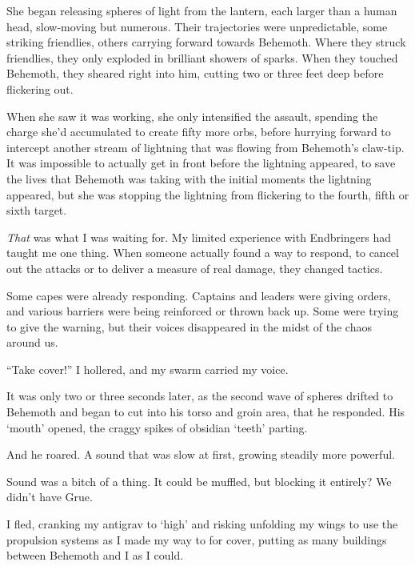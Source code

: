 She began releasing spheres of light from the lantern, each larger than a human head, slow-moving but numerous.  Their trajectories were unpredictable, some striking friendlies, others carrying forward towards Behemoth.  Where they struck friendlies, they only exploded in brilliant showers of sparks.  When they touched Behemoth, they sheared right into him, cutting two or three feet deep before flickering out.



When she saw it was working, she only intensified the assault, spending the charge she'd accumulated to create fifty more orbs, before hurrying forward to intercept another stream of lightning that was flowing from Behemoth's claw-tip.  It was impossible to actually get in front before the lightning appeared, to save the lives that Behemoth was taking with the initial moments the lightning appeared, but she was stopping the lightning from flickering to the fourth, fifth or sixth target.



\emph{That} was what I was waiting for.  My limited experience with Endbringers had taught me one thing.  When someone actually found a way to respond, to cancel out the attacks or to deliver a measure of real damage, they changed tactics.



Some capes were already responding.  Captains and leaders were giving orders, and various barriers were being reinforced or thrown back up.  Some were trying to give the warning, but their voices disappeared in the midst of the chaos around us.



``Take cover!'' I hollered, and my swarm carried my voice.



It was only two or three seconds later, as the second wave of spheres drifted to Behemoth and began to cut into his torso and groin area, that he responded.  His `mouth' opened, the craggy spikes of obsidian `teeth' parting.



And he roared.  A sound that was slow at first, growing steadily more powerful.



Sound was a bitch of a thing.  It could be muffled, but blocking it entirely?  We didn't have Grue.



I fled, cranking my antigrav to `high' and risking unfolding my wings to use the propulsion systems as I made my way to for cover, putting as many buildings between Behemoth and I as I could.



